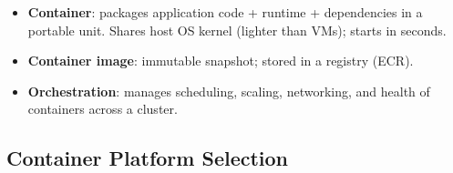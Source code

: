 

\begin{keyfacts}
\begin{itemize}
  \item \textbf{Container}: packages application code + runtime + dependencies in a portable unit.
        Shares host OS kernel (lighter than VMs); starts in seconds.
  \item \textbf{Container image}: immutable snapshot; stored in a registry (ECR).
  \item \textbf{Orchestration}: manages scheduling, scaling, networking, and health of containers
        across a cluster.
\end{itemize}
\end{keyfacts}

\subsection{Container Platform Selection}

